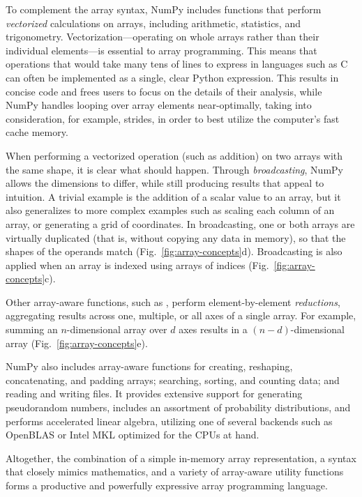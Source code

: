 To complement the array syntax, NumPy includes functions that perform
\emph{vectorized} calculations on arrays, including arithmetic, statistics, and
trigonometry.
Vectorization---operating on whole arrays rather than their individual
elements---is essential to array programming.
This means that operations that would take many tens of lines to express in
languages such as C can often be implemented as a single, clear Python
expression.
This results in concise code and frees users to focus on the details of
their analysis, while NumPy handles looping over array elements near-optimally,
taking into consideration, for example, strides, in order to best utilize the
computer's fast cache memory.

When performing a vectorized operation (such as addition) on two arrays with
the same shape, it is clear what should happen.
Through \emph{broadcasting}, NumPy allows the dimensions to differ, while
still producing results that appeal to intuition.
A trivial example is the addition of a scalar value to an array, but it also
generalizes to more complex examples such as scaling each column of an array,
or generating a grid of coordinates.
In broadcasting, one or both arrays are virtually duplicated (that is, without
copying any data in memory), so that the shapes of the operands match
(Fig.~\ref{fig:array-concepts}d).
Broadcasting is also applied when an array is indexed using arrays of
indices (Fig.~\ref{fig:array-concepts}c).

Other array-aware functions, such as , perform
element-by-element \emph{reductions}, aggregating results across one,
multiple, or all axes of a single array.
For example, summing an $n$-dimensional array over $d$ axes results in a
$(n-d)$-dimensional array (Fig.~\ref{fig:array-concepts}e).

NumPy also includes array-aware functions for creating, reshaping, concatenating, and padding
arrays; searching, sorting, and counting data; and reading and writing files.
It provides extensive support for generating pseudorandom numbers,
includes an assortment of probability distributions, and
performs accelerated linear algebra, utilizing one of several backends
such as OpenBLAS \cite{wang2013augem,xianyi2012model} or Intel MKL optimized
for the CPUs at hand.

Altogether, the combination of a simple in-memory array
representation, a syntax that closely mimics mathematics, and a
variety of array-aware utility functions forms a productive and
powerfully expressive array programming language.

